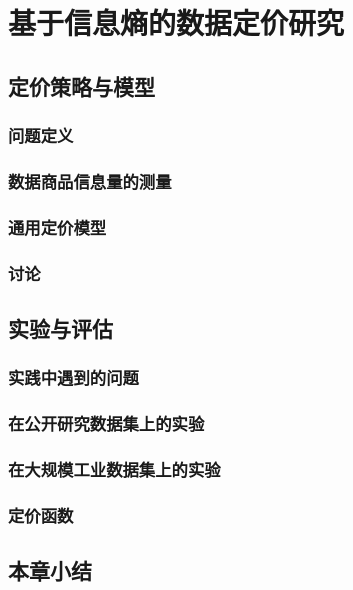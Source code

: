 \chapter{基于信息熵的数据定价研究}

\section{定价策略与模型}

\subsection{问题定义}

\subsection{数据商品信息量的测量}

\subsection{通用定价模型}

\subsection{讨论}

\section{实验与评估}

\subsection{实践中遇到的问题}

\subsection{在公开研究数据集上的实验}

\subsection{在大规模工业数据集上的实验}

\subsection{定价函数}

\section{本章小结}